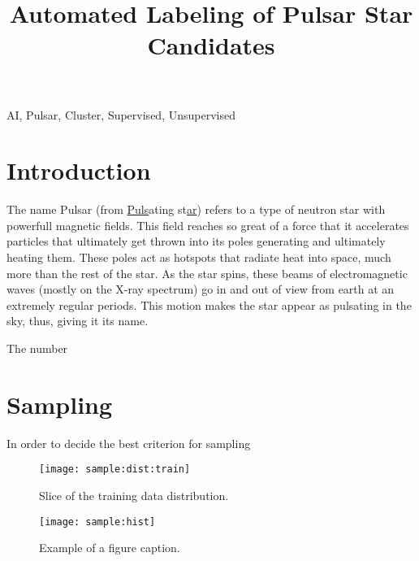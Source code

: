 \documentclass[conference]{IEEEtran}
\begin{document}
\title{Automated Labeling of Pulsar Star Candidates}

\author{
}

\maketitle

\begin{abstract}
\todo{}
\end{abstract}

\begin{IEEEkeywords}
AI, Pulsar, Cluster, Supervised, Unsupervised
\end{IEEEkeywords}

\section{Introduction}
\todo{}
The name Pulsar (from \underline{Puls}ating st\underline{ar}) refers to a
type of neutron star with powerfull magnetic fields.\cite{nasa:pulsar}
This field reaches so great of a force that it accelerates particles that 
ultimately get thrown into its poles generating and ultimately heating them.
These poles act as hotspots that radiate heat into space, much more than
the rest of the star. As the star spins, these beams of electromagnetic
waves (mostly on the X-ray spectrum) go in and out of view from earth at an
extremely regular periods. This motion makes the star appear as pulsating
in the sky, thus, giving it its name.

The number 
\section{Sampling}

In order to decide the best criterion for sampling


\begin{figure}[h]
    \texttt{[image: sample:dist:train]}
    \caption{Slice of the training data distribution. \label{fig:sample:dist:train}}    
\end{figure}

\begin{figure*}[h]
    \texttt{[image: sample:hist]}
    \caption{Example of a figure caption. \label{fig:sample:hist}}
\end{figure*}
\end{document}

